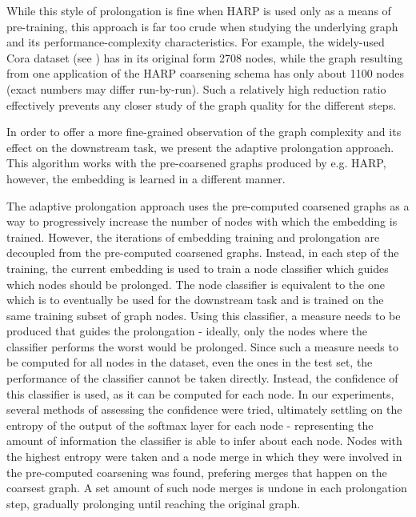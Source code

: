While this style of prolongation is fine when HARP is used only as a means of pre-training, this approach is far too crude when studying the underlying graph and its performance-complexity characteristics. For example, the widely-used Cora dataset (see \cite{yang_revisiting_2016}) has in its original form 2708 nodes, while the graph resulting from one application of the HARP coarsening schema has only about 1100 nodes (exact numbers may differ run-by-run). Such a relatively high reduction ratio effectively prevents any closer study of the graph quality for the different steps.

In order to offer a more fine-grained observation of the graph complexity and its effect on the downstream task, we present the adaptive prolongation approach. This algorithm works with the pre-coarsened graphs produced by e.g. HARP, however, the embedding is learned in a different manner.

The adaptive prolongation approach uses the pre-computed coarsened graphs as a way to progressively increase the number of nodes with which the embedding is trained. However, the iterations of embedding training and prolongation are decoupled from the pre-computed coarsened graphs. Instead, in each step of the training, the current embedding is used to train a node classifier which guides which nodes should be prolonged. The node classifier is equivalent to the one which is to eventually be used for the downstream task and is trained on the same training subset of graph nodes. Using this classifier, a measure needs to be produced that guides the prolongation - ideally, only the nodes where the classifier performs the worst would be prolonged. Since such a measure needs to be computed for all nodes in the dataset, even the ones in the test set, the performance of the classifier cannot be taken directly. Instead, the confidence of this classifier is used, as it can be computed for each node. In our experiments, several methods of assessing the confidence were tried, ultimately settling on the entropy of the output of the softmax layer for each node - representing the amount of information the classifier is able to infer about each node. Nodes with the highest entropy were taken and a node merge in which they were involved in the pre-computed coarsening was found, prefering merges that happen on the coarsest graph. A set amount of such node merges is undone in each prolongation step, gradually prolonging until reaching the original graph.

